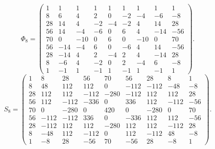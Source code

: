 \documentclass[11pt]{amsart}
\begin{document}
\[
\Phi_{8}=\begin{pmatrix}
1 & 1 & 1 & 1 & 1 & 1 & 1 & 1 & 1 \\
8 & 6 & 4 & 2 & 0 & -2 & -4 & -6 & -8 \\
28 & 14 & 4 & -2 & -4 & -2 & 4 & 14 & 28 \\
56 & 14 & -4 & -6 & 0 & 6 & 4 & -14 & -56 \\
70 & 0 & -10 & 0 & 6 & 0 & -10 & 0 & 70 \\
56 & -14 & -4 & 6 & 0 & -6 & 4 & 14 & -56 \\
28 & -14 & 4 & 2 & -4 & 2 & 4 & -14 & 28 \\
8 & -6 & 4 & -2 & 0 & 2 & -4 & 6 & -8 \\
1 & -1 & 1 & -1 & 1 & -1 & 1 & -1 & 1
\end{pmatrix}.
\]
\[
S_{8}=\begin{pmatrix}
1 & 8 & 28 & 56 & 70 & 56 & 28 & 8 & 1 \\
8 & 48 & 112 & 112 & 0 & -112 & -112 & -48 & -8 \\
28 & 112 & 112 & -112 & -280 & -112 & 112 & 112 & 28 \\
56 & 112 & -112 & -336 & 0 & 336 & 112 & -112 & -56 \\
70 & 0 & -280 & 0 & 420 & 0 & -280 & 0 & 70 \\
56 & -112 & -112 & 336 & 0 & -336 & 112 & 112 & -56 \\
28 & -112 & 112 & 112 & -280 & 112 & 112 & -112 & 28 \\
8 & -48 & 112 & -112 & 0 & 112 & -112 & 48 & -8 \\
1 & -8 & 28 & -56 & 70 & -56 & 28 & -8 & 1
\end{pmatrix}.
\]
\end{document}
